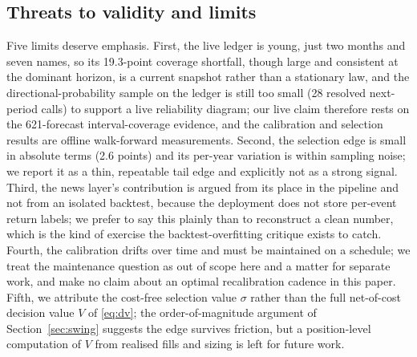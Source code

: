 \documentclass{sbc2023}%
\theoremstyle{definition}
\theoremstyle{plain}
\begin{document}
\subsection{Threats to validity and limits}
Five limits deserve emphasis. First, the live ledger is young, just two months and seven
names, so its 19.3-point coverage shortfall, though large and consistent at the
dominant horizon, is a current snapshot rather than a stationary law, and the
directional-probability sample on the ledger is still too small (28 resolved
next-period calls) to support a live reliability diagram; our live claim therefore
rests on the 621-forecast interval-coverage evidence, and the calibration and selection
results are offline walk-forward measurements. Second, the selection edge is small in
absolute terms (2.6 points) and its per-year variation is within sampling noise; we
report it as a thin, repeatable tail edge and explicitly not as a strong signal.
Third, the news layer's contribution is argued from its place in the pipeline and not
from an isolated backtest, because the deployment does not store per-event return
labels; we prefer to say this plainly than to reconstruct a clean number, which is the
kind of exercise the backtest-overfitting critique exists to catch. Fourth, the
calibration drifts over time and must be maintained on a schedule; we treat the
maintenance question as out of scope here and a matter for separate work, and make no
claim about an optimal recalibration cadence in this paper. Fifth, we attribute the
cost-free selection value $\sigma$ rather than the full net-of-cost decision value $V$
of \eqref{eq:dv}; the order-of-magnitude argument of Section~\ref{sec:swing} suggests
the edge survives friction, but a position-level computation of $V$ from realised fills
and sizing is left for future work.
\end{document}
